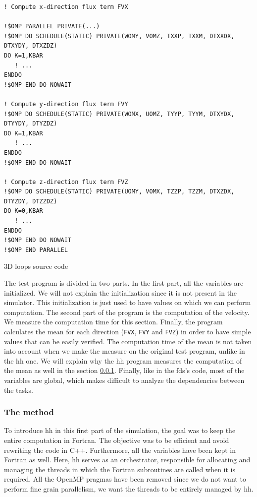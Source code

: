 \begin{listing}[ht!]
\begin{verbatim}
! Compute x-direction flux term FVX

!$OMP PARALLEL PRIVATE(...)
!$OMP DO SCHEDULE(STATIC) PRIVATE(WOMY, VOMZ, TXXP, TXXM, DTXXDX, DTXYDY, DTXZDZ)
DO K=1,KBAR
   ! ...
ENDDO
!$OMP END DO NOWAIT

! Compute y-direction flux term FVY
!$OMP DO SCHEDULE(STATIC) PRIVATE(WOMX, UOMZ, TYYP, TYYM, DTXYDX, DTYYDY, DTYZDZ)
DO K=1,KBAR
   ! ...
ENDDO
!$OMP END DO NOWAIT

! Compute z-direction flux term FVZ
!$OMP DO SCHEDULE(STATIC) PRIVATE(UOMY, VOMX, TZZP, TZZM, DTXZDX, DTYZDY, DTZZDZ)
DO K=0,KBAR
   ! ...
ENDDO
!$OMP END DO NOWAIT
!$OMP END PARALLEL
\end{verbatim}
\caption{3D loops source code}
\label{lst:3Dloopscode}
\end{listing}

The test program is divided in two parts. In the first part, all the variables
are initialized. We will not explain the initialization since it is not present
in the simulator. This initialization is just used to have values on which we
can perform computation. The second part of the program is the computation of
the velocity. We measure the computation time for this section. Finally, the
program calculates the mean for each direction (\texttt{FVX}, \texttt{FVY} and
\texttt{FVZ}) in order to have simple values that can be easily verified. The
computation time of the mean is not taken into account when we make the measure
on the original test program, unlike in the \gls{hh} one. We will explain why
the \gls{hh} program measures the computation of the mean as well in the section
\ref{sec:3Dloopsmethod}. Finally, like in the \gls{fds}'s code, most of the
variables are global, which makes difficult to analyze the dependencies between
the tasks.

\subsubsection{The method}
\label{sec:3Dloopsmethod}

To introduce \gls{hh} in this first part of the simulation, the goal was to keep
the entire computation in Fortran. The objective was to be efficient and avoid
rewriting the code in C++. Furthermore, all the variables have been kept in
Fortran as well. Here, \gls{hh} serves as an orchestrator, responsible for
allocating and managing the threads in which the Fortran subroutines are called
when it is required. All the OpenMP pragmas have been removed since we do not
want to perform fine grain parallelism, we want the threads to be entirely
managed by \gls{hh}.


